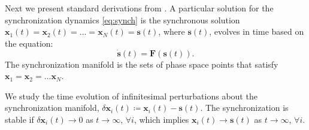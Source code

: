 \documentclass[%
 reprint,
 amsmath,amssymb,
 aip,
]{revtex4-2}
\def \bF {\pmb{F}}
\def \bx {\pmb{x}}
\def \bs {\pmb{s}}
\theoremstyle{italichead}
\theoremstyle{definition}
\begin{document}
{Next we present standard derivations from \cite{fujisaka1983stability,pecora1998master}.
A particular solution for the synchronization dynamics  \eqref{eq:synch} is the synchronous solution $\bx_1(t)=\bx_2(t)=...=\bx_N(t)=\bs(t)$, where $\bs(t)$, evolves in time based on the equation:
\begin{equation} \label{eq:s}
    \dot{\bs} (t) = \bF(\bs(t)).
\end{equation}
The synchronization manifold is the sets of phase space points that satisfy  $\bx_1 = \bx_2 = \hdots \bx_N$.

We study the time evolution of infinitesimal perturbations about the synchronization manifold, $\delta \bx_i (t) \coloneq \bx_i (t) - \bs(t)$. 
The synchronization is stable if $\delta \bx_i (t) \to 0$ as $t \to \infty$, $\forall i$, which implies $\bx_i (t) \to \bs(t)$ as $t \to \infty$, $\forall i$. 

}
\end{document}
